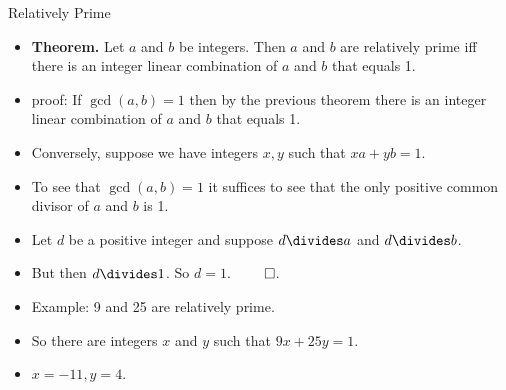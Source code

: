 \documentclass{beamer}
\begin{document}
\begin{frame}{Relatively Prime}

\begin{itemize}
  \item \textbf{Theorem.} Let $a$ and $b$ be integers. Then $a$ and $b$ are relatively prime iff there is an
  integer linear combination of $a$ and $b$ that equals 1.
  \item proof: If $\gcd(a,b) = 1$ then by the previous theorem there is an integer linear combination of
  $a$ and $b$ that equals 1.
  \item Conversely, suppose we have integers $x,y$ such that $xa+yb=1$.
  \item To see that $\gcd(a,b)=1$ it suffices to see that the only positive common divisor of $a$ and $b$ is 1.
  \item Let $d$ be a positive integer and suppose $d\divides a$ and $d\divides b$.
  \item But then $d\divides 1$. So $d=1$. $\qed$.
  \item  Example: 9 and 25 are relatively prime.
  \item So there are integers $x$ and $y$ such that $9x + 25y = 1$.
  \item $x=-11, y=4$.
\end{itemize}

\end{frame}
\end{document}
